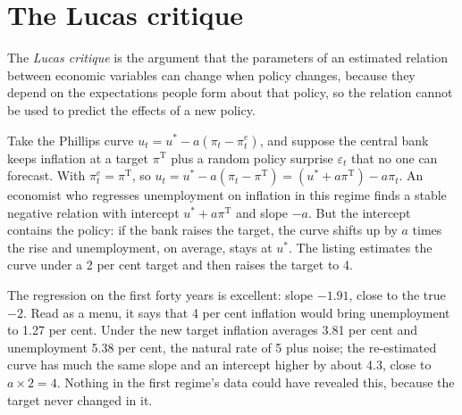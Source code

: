 \section{The Lucas critique}\label{sec:b2:expectations-and-lucas-critique:critique}

\begin{definition}\label{def:b2:expectations-and-lucas-critique:lucas-critique}
The \emph{Lucas critique} is the argument that the parameters of an estimated relation between
economic variables can change when policy changes, because they depend on the expectations people form about that policy,
so the relation cannot be used to predict the effects of a new policy.
\end{definition}

Take the Phillips curve $u_t = u^* - a(\pi_t - \pi^e_t)$, and suppose the central bank keeps inflation at a target $\pi^{\mathrm T}$ plus a random policy surprise $\varepsilon_t$ that no one can forecast.
With  $\pi^e_t = \pi^{\mathrm T}$, so $u_t = u^* - a(\pi_t - \pi^{\mathrm T}) = (u^* + a\pi^{\mathrm T}) - a\pi_t$. An economist who regresses unemployment on inflation in this regime finds a stable
negative relation with intercept $u^* + a\pi^{\mathrm T}$ and slope $-a$. But the intercept contains the policy: if the bank raises the target, the curve shifts
up by $a$ times the rise and unemployment, on average, stays at $u^*$. The listing estimates the curve under a 2 per cent target and
then raises the target to 4.

\label{lst:b2:expectations-and-lucas-critique:lucas}

\label{out:b2:expectations-and-lucas-critique:lucas}

The regression on the first forty years is excellent: slope $-1.91$, close to the true $-2$. Read as a menu, it says that 4 per cent
inflation would bring unemployment to 1.27 per cent. Under the new target inflation averages 3.81 per cent and unemployment 5.38 per cent,
the natural rate of 5 plus noise; the re-estimated curve has much the same slope and an intercept higher by about 4.3, close to
$a \times 2 = 4$. Nothing in the first regime's data could have revealed this, because the target never changed in it.

